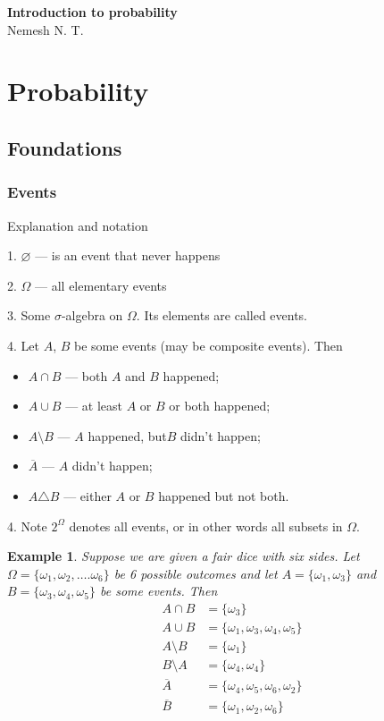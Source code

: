 \documentclass[10pt]{article}
\newtheorem*{example}{Example}
\begin{document}
\begin{center}

    \Large \textbf{Introduction to probability}\\[0.5cm]
    \small {Nemesh N. T.}\\[0.5cm]

\end{center}

\section{Probability}

\subsection{Foundations}

\subsubsection{Events}

Explanation and notation

1. $\varnothing$ --- is an event that never happens

2. $\Omega$ --- all elementary events

3. Some $\sigma$-algebra on $\Omega$. Its elements are called events.

4. Let $A$, $B$ be some events (may be composite events). Then
\begin{itemize}
    \item $A\cap B$ --- both $A$ and $B$ happened;
    \item $A\cup B$ --- at least $A$ or $B$ or both happened;
    \item $A\setminus B$ --- $A$ happened, but$B$ didn't happen;
    \item $\overline{A}$ ---  $A$ didn't happen;
    \item $A\triangle B$ --- either $A$ or $B$ happened but not both.
\end{itemize}

4. Note $2^\Omega$ denotes all events, or in other words all subsets in
$\Omega$.

\begin{example}

    Suppose we are given a fair dice with six sides. Let
    $\Omega=\{\omega_1,\omega_2,\ldots.\omega_6\}$ be 6 possible outcomes and
    let $A=\{\omega_1, \omega_3\}$ and $B=\{\omega_3,\omega_4,\omega_5\}$ be
    some events. Then
    \begin{align}
        A\cap B      & =\{\omega_3\}                            \\
        A\cup B      & =\{\omega_1,\omega_3,\omega_4,\omega_5\} \\
        A\setminus B & =\{\omega_1\}                            \\
        B\setminus A & =\{\omega_4,\omega_4\}                   \\
        \overline{A} & =\{\omega_4,\omega_5,\omega_6,\omega_2\} \\
        \overline{B} & =\{\omega_1,\omega_2,\omega_6\}
    \end{align}
\end{example}
\end{document}
